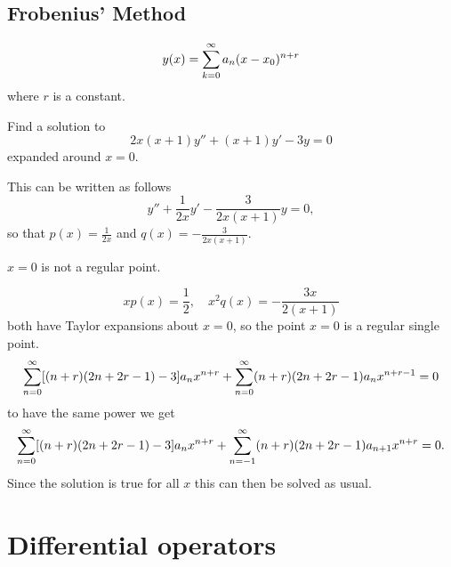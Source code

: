 \documentclass[10pt, a4paper]{article}
\begin{document}
\subsection{Frobenius' Method}
\[
y(x) = \infsumo a_n(x - x_0) ^ {n + r}
\]
where $r$ is a constant.

\begin{example}
    Find a solution to
    \[
    2x(x + 1)y'' + (x + 1)y' - 3y = 0
    \]
    expanded around $x = 0$.

    \begin{solution}
        This can be written as follows
        \[
        y'' + \frac{1}{2x}y' - \frac{3}{2x(x + 1)}y = 0,
        \]
        so that $p(x) = \frac{1}{2x}$ and $q(x) = -\frac{3}{2x(x + 1)}$.

        $x = 0$ is not a regular point.

        \[
        xp(x) = \frac{1}{2},\quad x ^ 2q(x) = -\frac{3x}{2(x + 1)}
        \]
        both have Taylor expansions about $x = 0$,
        so the point $x = 0$ is a regular single point.
        \[
        \infsum[n = 0][(n + r)(2n + 2r - 1) - 3]a_nx ^ {n + r} + \infsum[n = 0](n + r)(2n + 2r - 1)a_nx ^ {n + r - 1} = 0
        \]
        to have the same power we get
        \[
        \infsum[n = 0][(n + r)(2n + 2r - 1) - 3]a_nx ^ {n + r} + \infsum[n = -1](n + r)(2n + 2r - 1)a_{n + 1}x ^ {n + r} = 0.
        \]
        Since the solution is true for all $x$ this can then be solved as usual.
    \end{solution}
\end{example}

\newpage

\section{Differential operators}
\end{document}
